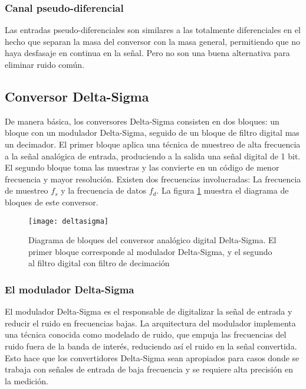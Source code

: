 
\subsubsection{Canal pseudo-diferencial}
\label{subs:canal_pseudo_diferencial}

Las entradas pseudo-diferenciales son similares a las totalmente diferenciales en el hecho que separan la masa del conversor con la masa general, permitiendo que no haya desfasaje en continua en la señal. Pero no son una buena alternativa para eliminar ruido común.\cite{tipos_canales}



\subsection{Conversor Delta-Sigma} %
\label{sub:conversor_delta_sigma}

De manera básica, los conversores Delta-Sigma consisten en dos bloques: un bloque con un modulador Delta-Sigma, seguido de un bloque de filtro digital mas un decimador. El primer bloque aplica una técnica de muestreo de alta frecuencia a la señal analógica de entrada, produciendo a la salida una señal digital de 1 bit. El segundo bloque toma las muestras y las convierte en un código de menor frecuencia y mayor resolución. Existen dos frecuencias involucradas: La frecuencia de muestreo $f_s$ y la frecuencia de datos $f_d$. La figura \ref{fig:deltasigma} muestra el diagrama de bloques de este conversor.\cite{delta_sigma_1}

\begin{figure}[h]
  \centering
  \texttt{[image: deltasigma]}
  \caption{Diagrama de bloques del conversor analógico digital Delta-Sigma. El primer bloque corresponde al modulador Delta-Sigma, y el segundo al filtro digital con filtro de decimación}\label{fig:deltasigma}
\end{figure}

\subsubsection{El modulador Delta-Sigma} %
\label{ssub:el_modulador_delta_sigma}

El modulador Delta-Sigma es el responsable de digitalizar la señal de entrada y reducir el ruido en frecuencias bajas. La arquitectura del modulador implementa una técnica conocida como modelado de ruido, que empuja las frecuencias del ruido fuera de la banda de interés, reduciendo así el ruido en la señal convertida. Esto hace que los convertidores Delta-Sigma sean apropiados para casos donde se trabaja con señales de entrada de baja frecuencia y se requiere alta precisión en la medición. \\

